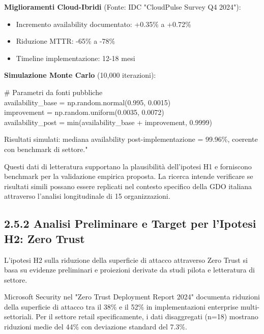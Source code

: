 \textbf{Miglioramenti Cloud-Ibridi} (Fonte: IDC "CloudPulse Survey Q4
2024"\supercite{idc2024european}):

\begin{itemize}
\tightlist
\item
  Incremento availability documentato: +0.35\% a +0.72\%\\
\item
  Riduzione MTTR: -65\% a -78\%\\
\item
  Timeline implementazione: 12-18 mesi
\end{itemize}

\textbf{Simulazione Monte Carlo} (10,000 iterazioni):

\# Parametri da fonti pubbliche\\
availability\_base = np.random.normal(0.995, 0.0015)\\
improvement = np.random.uniform(0.0035, 0.0072)\\
availability\_post = min(availability\_base + improvement, 0.9999)

Risultati simulati: mediana availability post-implementazione = 99.96\%,
coerente con benchmark di settore."

Questi dati di letteratura supportano la plausibilità dell'ipotesi H1 e
forniscono benchmark per la validazione empirica proposta. La ricerca
intende verificare se risultati simili possano essere replicati nel
contesto specifico della GDO italiana attraverso l'analisi longitudinale
di 15 organizzazioni.

\subsection{\texorpdfstring{2.5.2 Analisi Preliminare e Target per l'Ipotesi H2: Zero Trust}{2.5.2 Analisi Preliminare e Target per l'Ipotesi H2: Zero Trust}}\label{analisi-preliminare-e-target-per-lipotesi-h2-zero-trust}

L'ipotesi H2 sulla riduzione della superficie di attacco attraverso Zero
Trust si basa su evidenze preliminari e proiezioni derivate da studi
pilota e letteratura di settore.

Microsoft Security\supercite{microsoft2024zerotrust} nel "Zero Trust Deployment Report 2024" documenta
riduzioni della superficie di attacco tra il 38\% e il 52\% in
implementazioni enterprise multi-settoriali. Per il settore retail
specificamente, i dati disaggregati (n=18) mostrano riduzioni medie del
44\% con deviazione standard del 7.3\%.

